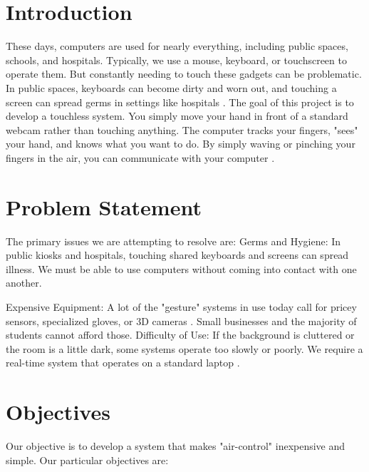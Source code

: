 \documentclass[conference]{IEEEtran}
\begin{document}
\section{Introduction}
These days, computers are used for nearly everything, including public spaces, schools, and hospitals. Typically, we use a mouse, keyboard, or touchscreen to operate them. But constantly needing to touch these gadgets can be problematic. In public spaces, keyboards can become dirty and worn out, and touching a screen can spread germs in settings like hospitals \cite{ref10}. The goal of this project is to develop a touchless system. You simply move your hand in front of a standard webcam rather than touching anything. The computer tracks your fingers, "sees" your hand, and knows what you want to do. By simply waving or pinching your fingers in the air, you can communicate with your computer \cite{ref2}.

\section{Problem Statement}
The primary issues we are attempting to resolve are:
Germs and Hygiene: In public kiosks and hospitals, touching shared keyboards and screens can spread illness. We must be able to use computers without coming into contact with one another.

Expensive Equipment: A lot of the "gesture" systems in use today call for pricey sensors, specialized gloves, or 3D cameras \cite{ref5}. Small businesses and the majority of students cannot afford those.
Difficulty of Use: If the background is cluttered or the room is a little dark, some systems operate too slowly or poorly. We require a real-time system that operates on a standard laptop \cite{ref7}.

\section{Objectives}
Our objective is to develop a system that makes "air-control" inexpensive and simple. Our particular objectives are:
\end{document}
